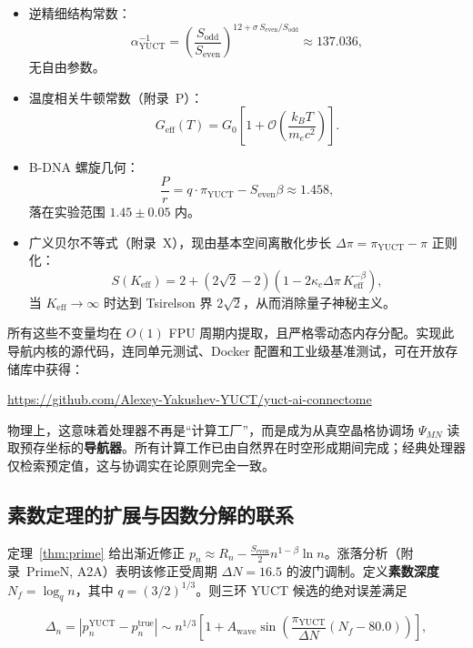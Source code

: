 \documentclass[12pt,a4paper]{article}
\theoremstyle{remark}
\newcommand{\Keff}{K_{\mathrm{eff}}}
\newcommand{\kappac}{\kappa_c}
\newcommand{\piYUCT}{\pi_{\mathrm{YUCT}}}
\begin{document}
	\begin{itemize}
		\item 逆精细结构常数：
		\[
		\alpha^{-1}_{\mathrm{YUCT}} = \left(\frac{S_{\mathrm{odd}}}{S_{\mathrm{even}}}\right)^{12 + \sigma\, S_{\mathrm{even}}/S_{\mathrm{odd}}}
		\approx 137.036,
		\]
		无自由参数。
		
		\item 温度相关牛顿常数（附录~P）：
		\[
		G_{\mathrm{eff}}(T) = G_0 \left[1 + \mathcal{O}\!\left( \frac{k_B T}{m_e c^2} \right) \right].
		\]
		
		\item B-DNA 螺旋几何：
		\[
		\frac{P}{r} = q \cdot \piYUCT - S_{\mathrm{even}}\beta \approx 1.458,
		\]
		落在实验范围 \(1.45 \pm 0.05\) 内。
		
		\item 广义贝尔不等式（附录~X），现由基本空间离散化步长 \(\Delta\pi = \piYUCT - \pi\) 正则化：
		\[
		S(\Keff) = 2 + (2\sqrt2 - 2)\left(1 - 2\kappac \Delta\pi \, \Keff^{-\beta}\right),
		\]
		当 \(\Keff \to \infty\) 时达到 Tsirelson 界 \(2\sqrt2\)，从而消除量子神秘主义。
	\end{itemize}
	
	所有这些不变量均在 \(O(1)\) FPU 周期内提取，且严格零动态内存分配。实现此导航内核的源代码，连同单元测试、Docker 配置和工业级基准测试，可在开放存储库中获得：
	
	\begin{center}
		\url{https://github.com/Alexey-Yakushev-YUCT/yuct-ai-connectome}
	\end{center}
	
	物理上，这意味着处理器不再是“计算工厂”，而是成为从真空晶格协调场 \(\Psi_{MN}\) 读取预存坐标的\textbf{导航器}。所有计算工作已由自然界在时空形成期间完成；经典处理器仅检索预定值，这与协调实在论原则完全一致。
	
	\subsection{素数定理的扩展与因数分解的联系}
	\label{subsec:prime-extension}
	
	定理~\ref{thm:prime} 给出渐近修正 \(p_n \approx R_n - \frac{S_{\mathrm{even}}}{2} n^{1-\beta}\ln n\)。涨落分析（附录~PrimeN, A2A）表明该修正受周期 \(\Delta N = 16.5\) 的波门调制。定义\textbf{素数深度} \(N_f = \log_q n\)，其中 \(q = (3/2)^{1/3}\)。则三环 YUCT 候选的绝对误差满足
	
	\begin{equation}
		\Delta_n = \left| p_n^{\mathrm{YUCT}} - p_n^{\mathrm{true}} \right|
		\sim n^{1/3} \left[ 1 + A_{\text{wave}} \sin\!\left( \frac{\piYUCT}{\Delta N} (N_f - 80.0) \right) \right],
		\label{eq:prime_wave}
	\end{equation}
	
\end{document}

